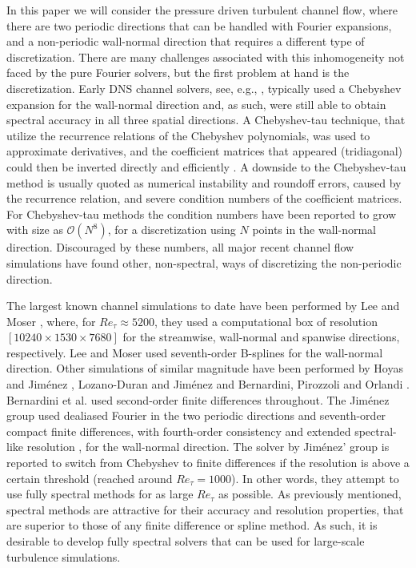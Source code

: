 \documentclass[preprint]{elsarticle}
\begin{document}
In this paper we will consider the pressure driven turbulent channel flow, where there are two periodic directions that can be handled with Fourier expansions, and a non-periodic wall-normal direction that requires a different type of discretization. There are many challenges associated with this inhomogeneity not faced by the pure Fourier solvers, but the first problem at hand is the discretization. Early DNS channel solvers, see, e.g., \cite{Moin80, Kleiser80, Kim87}, typically used a Chebyshev expansion for the wall-normal direction and, as such, were still able to obtain spectral accuracy in all three spatial directions. A Chebyshev-tau technique, that utilize the recurrence relations of the Chebyshev polynomials, was used to approximate derivatives, and the coefficient matrices that appeared (tridiagonal) could then be inverted directly and efficiently \cite{Kim87}. A downside to the Chebyshev-tau method is usually quoted \cite{canuto1988} as numerical instability and roundoff errors, caused by the recurrence relation, and severe condition numbers of the coefficient matrices. For Chebyshev-tau methods the condition numbers have been reported to grow with size as $\mathcal{O}(N^8)$, for a discretization using $N$ points in the wall-normal direction. Discouraged by these numbers, all major recent channel flow simulations have found other, non-spectral, ways of discretizing the non-periodic direction. 


The largest known channel simulations to date have been performed by Lee and Moser \cite{leemoser15}, where, for $Re_{\tau}\approx 5200$, they used a computational box of resolution $[10240 \times 1530 \times 7680]$ for the streamwise, wall-normal and spanwise directions, respectively. Lee and Moser used seventh-order B-splines for the wall-normal direction. Other simulations of similar magnitude have been performed by Hoyas and Jim\'{e}nez \cite{hoyas06, hoyas08}, Lozano-Duran and Jim\'{e}nez \cite{Lozano2014} and Bernardini, Pirozzoli and Orlandi \cite{bernardini2014}. Bernardini et al. used second-order finite differences throughout. The Jim\'{e}nez group used dealiased Fourier in the two periodic directions and seventh-order compact finite differences, with fourth-order consistency and extended spectral-like resolution \cite{Lele92}, for the wall-normal direction. The solver by Jim\'{e}nez' group is reported to switch from Chebyshev to finite differences if the resolution is above a certain threshold \cite{hoyas08} (reached around $Re_{\tau}=1000$). In other words, they attempt to use fully spectral methods for as large $Re_{\tau}$ as possible. As previously mentioned, spectral methods are attractive for their accuracy and resolution properties, that are superior to those of any finite difference or spline method. As such, it is desirable to develop fully spectral solvers that can be used for large-scale turbulence simulations.
\end{document}
